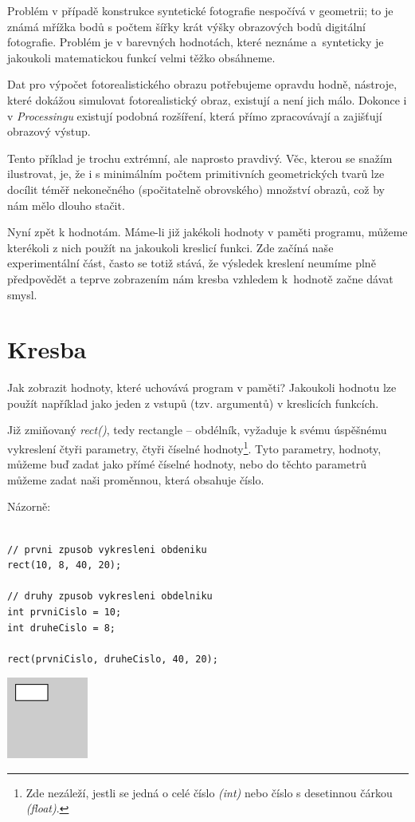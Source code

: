 \documentclass[10pt,twoside=true,open=right,cleardoublepage=empty,chapterprefix=true]{scrbook}
\newcommand{\poznamka}[1]{\footnote{\/ #1}}
\newcommand{\oddil}[1]{\section{#1}\index{#1}\label{#1}}
\newcommand{\vyraz}[1]{\textit{\gls{#1}}\index{#1}\label{#1}}
\begin{document}
Problém v případě konstrukce syntetické fotografie nespočívá v geomet\-rii; to je známá mřížka bodů s počtem šířky krát výšky obrazových bodů digitální fotografie. Problém je v barevných hodnotách, které neznáme a~synteticky je jakoukoli matematickou funkcí velmi těžko obsáhneme.

Dat pro výpočet fotorealistického obrazu potřebujeme opravdu hodně, nástroje, které dokážou simulovat fotorealistický obraz, existují a není jich málo. Dokonce i v {\em Processingu} existují podobná rozšíření, která přímo zpracovávají a zajišťují obrazový výstup.

Tento příklad je trochu extrémní, ale naprosto pravdivý. Věc, kterou se snažím ilustrovat, je, že i s minimálním počtem primitivních geometrických tvarů lze docílit téměř nekonečného (spočitatelně obrovského) množství obrazů, což by nám mělo dlouho stačit.

Nyní zpět k hodnotám. Máme-li již jakékoli hodnoty v paměti programu, můžeme kterékoli z nich použít na jakoukoli kreslicí funkci. Zde začíná naše experimentální část, často se totiž stává, že výsledek kreslení neumíme plně předpovědět a teprve zobrazením nám kresba vzhledem k~hodnotě začne dávat smysl.

\oddil{Kresba}

Jak zobrazit hodnoty, které uchovává program v paměti? Jakoukoli hodnotu lze použít například jako jeden z vstupů (tzv. argumentů) v kreslicích funkcích.

Již zmiňovaný \vyraz{rect()}, tedy rectangle -- obdélník, vyžaduje k svému úspěšnému vykreslení čtyři parametry, čtyři číselné hodnoty\poznamka{Zde nezáleží, jestli se jedná o celé číslo {\em (int)} nebo číslo s desetinnou čárkou {\em (float)}.}. Tyto parametry, hodnoty, můžeme buď zadat jako přímé číselné hodnoty, nebo do těchto parametrů můžeme zadat naši proměnnou, která obsahuje číslo.

Názorně:

\begin{lstlisting}

// prvni zpusob vykresleni obdeniku
rect(10, 8, 40, 20);

// druhy zpusob vykresleni obdelniku
int prvniCislo = 10;
int druheCislo = 8;

rect(prvniCislo, druheCislo, 40, 20);

\end{lstlisting}


\begin{center}
\includegraphics[width = 0.2\textwidth]{imgs/kresba-1.png}
\end{center}
\end{document}
